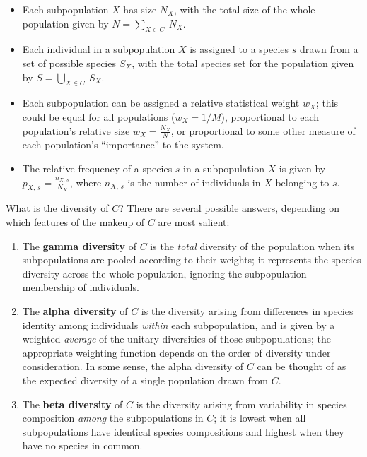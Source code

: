 \begin{itemize} %
\item Each subpopulation $X$ has size $N_X$, with the total size of the whole population given by $N = \sum_{X \in C}~N_X$.
\item Each individual in a subpopulation $X$ is assigned to a species $s$ drawn from a set of possible species $S_X$, with the total species set for the population given by $S = \bigcup_{X \in C}~S_X$.
\item Each subpopulation can be assigned a relative statistical weight $w_X$; this could be equal for all populations ($w_X = 1/M$), proportional to each population's relative size $w_X = \frac{N_X}{N}$, or proportional to some other measure of each population's ``importance'' to the system.
\item The relative frequency of a species $s$ in a subpopulation $X$ is given by $p_{X,\,s} = \frac{n_{X,\,s}}{N_X}$, where $n_{X,\,s}$ is the number of individuals in $X$ belonging to $s$.
\end{itemize}

\noindent What is the diversity of $C$? There are several possible answers, depending on which features of the makeup of $C$ are most salient:

\begin{enumerate}
\item The \textbf{gamma diversity} of $C$ is the \textit{total} diversity of the population when its subpopulations are pooled according to their weights; it represents the species diversity across the whole population, ignoring the subpopulation membership of individuals.
\item The \textbf{alpha diversity} of $C$ is the diversity arising from differences in species identity among individuals \textit{within} each subpopulation, and is given by a weighted \textit{average} of the unitary diversities of those subpopulations; the appropriate weighting function depends on the order of diversity under consideration. In some sense, the alpha diversity of $C$ can be thought of as the expected diversity of a single population drawn from $C$.
\item The \textbf{beta diversity} of $C$ is the diversity arising from variability in species composition \textit{among} the subpopulations in $C$; it is lowest when all subpopulations have identical species compositions and highest when they have no species in common.
\end{enumerate}

